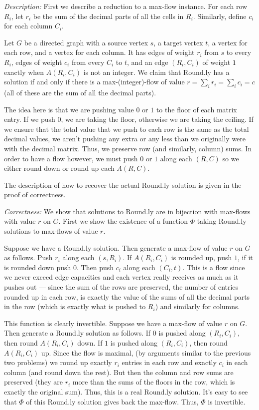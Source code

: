 \documentclass[12 pt, letterpaper]{hmcpset}
\begin{document}
\begin{solution}
	\emph{Description:} First we describe a reduction to a max-flow instance. For each row $R_{i}$, let $r_{i}$ be the sum of the decimal parts of all the cells in $R_{i}$. Similarly, define $c_{i}$ for each column $C_{i}$.

	Let $G$ be a directed graph with a source vertex $s$, a target vertex $t$, a vertex for each row, and a vertex for each column. It has edges of weight $r_{i}$ from $s$ to every $R_{i}$, edges of weight $c_{i}$ from every $C_{i}$ to $t$, and an edge $(R_{i}, C_{i})$ of weight $1$ exactly when $A(R_{i}, C_{i})$ is not an integer. We claim that Round.ly has a solution if and only if there is a max-(integer)-flow of value $r = \sum_{i} r_{i} = \sum_{i} c_{i} = c$ (all of these are the sum of all the decimal parts).

	The idea here is that we are pushing value $0$ or $1$ to the floor of each matrix entry. If we push $0$, we are taking the floor, otherwise we are taking the ceiling. If we ensure that the total value that we push to each row is the same as the total decimal values, we aren't pushing any extra or any less than we originally were with the decimal matrix. Thus, we preserve row (and similarly, column) sums. In order to have a flow however, we must push $0$ or $1$ along each $(R, C)$ so we either round down or round up each $A(R, C)$.

	The description of how to recover the actual Round.ly solution is given in the proof of correctness.

	\emph{Correctness:} We show that solutions to Round.ly are in bijection with max-flows with value $r$ on $G$. First we show the existence of a function $\Phi$ taking Round.ly solutions to max-flows of value $r$.

	Suppose we have a Round.ly solution. Then generate a max-flow of value $r$ on $G$ as follows. Push $r_{i}$ along each $(s, R_{i})$. If $A(R_{i}, C_{i})$ is rounded up, push $1$, if it is rounded down push $0$. Then push $c_{i}$ along each $(C_{i}, t)$. This is a flow since we never exceed edge capacities and each vertex really receives as much as it pushes out --- since the sum of the rows are preserved, the number of entries rounded up in each row, is exactly the value of the sums of all the decimal parts in the row (which is exactly what is pushed to $R_{i}$) and similarly for columns.

	This function is clearly invertible. Suppose we have a max-flow of value $r$ on $G$. Then generate a Round.ly solution as follows. If $0$ is pushed along $(R_{i}, C_{i})$, then round $A(R_{i}, C_{i})$ down. If $1$ is pushed along $(R_{i}, C_{i})$, then round $A(R_{i}, C_{i})$ up. Since the flow is maximal,  (by arguments similar to the previous two problems) we round up exactly $r_{i}$ entries in each row and exactly $c_{i}$ in each column (and round down the rest). But then the column and row sums are preserved (they are $r_{i}$ more than the sums of the floors in the row, which is exactly the original sum). Thus, this is a real Round.ly solution. It's easy to see that $\Phi$ of this Round.ly solution gives back the max-flow. Thus, $\Phi$ is invertible.


\end{solution}
\end{document}
